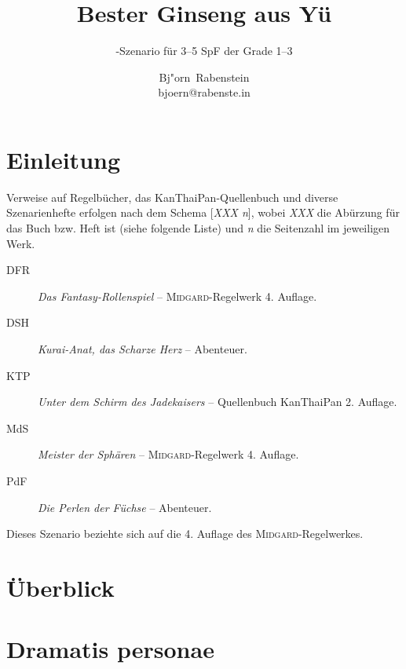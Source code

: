 \documentclass[12pt,a4paper,germanpar]{scrartcl}
\author{Bj"orn~Rabenstein\\bjoern@rabenste.in}
\title{Bester Ginseng aus Yü}
\subtitle{\midgard-Szenario für 3--5 SpF der Grade 1--3}
\newcommand{\midgard}{\textsc{Midgard}}
\begin{document}
\maketitle

\tableofcontents


\section{Einleitung}


Verweise auf Regelbücher, das KanThaiPan-Quellenbuch und diverse
Szenarienhefte erfolgen nach dem Schema [\emph{XXX n}], wobei
\emph{XXX} die Abürzung für das Buch bzw. Heft ist (siehe folgende
Liste) und \emph{n} die Seitenzahl im jeweiligen Werk.

\begin{description}
\item[DFR] \emph{Das Fantasy-Rollenspiel} -- \midgard-Regelwerk 4. Auflage.
\item[DSH] \emph{Kurai-Anat, das Scharze Herz} -- Abenteuer.
\item[KTP] \emph{Unter dem Schirm des Jadekaisers} -- Quellenbuch
  KanThaiPan 2. Auflage.
\item[MdS] \emph{Meister der Sphären} -- \midgard-Regelwerk 4. Auflage.
\item[PdF] \emph{Die Perlen der Füchse} -- Abenteuer.
\end{description}

Dieses Szenario beziehte sich auf die 4. Auflage des \midgard-Regelwerkes.

\section{Überblick}

\section{Dramatis personae}
\end{document}
